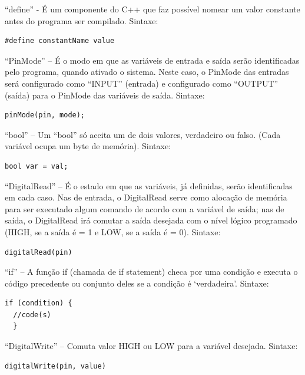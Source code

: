 \documentclass{article}
\begin{document}
``define'' - É um componente do C++ que faz possível nomear um valor constante antes do programa ser compilado. Sintaxe:
\begin{lstlisting}[style=Arduino]
#define constantName value
\end{lstlisting}

``PinMode'' – É o modo em que as variáveis de entrada e saída serão identificadas pelo programa, quando ativado o sistema. Neste caso, o PinMode das entradas será configurado como “INPUT” (entrada) e configurado como “OUTPUT” (saída) para o PinMode das variáveis de saída. Sintaxe:
\begin{lstlisting}[style=Arduino]
pinMode(pin, mode);
\end{lstlisting}

``bool'' – Um ``bool'' só aceita um de dois valores, verdadeiro ou falso. (Cada variável ocupa um byte de memória). Sintaxe:
\begin{lstlisting}[style=Arduino]
bool var = val;
\end{lstlisting}

``DigitalRead'' – É o estado em que as variáveis, já definidas, serão identificadas em cada caso. Nas de entrada, o DigitalRead serve como alocação de memória para ser executado algum comando de acordo com a variável de saída; nas de saída, o DigitalRead irá comutar a saída desejada com o nível lógico programado (HIGH, se a saída é = 1 e LOW, se a saída é = 0). Sintaxe:
\begin{lstlisting}[style=Arduino]
digitalRead(pin)
\end{lstlisting}

``if'' – A função if (chamada de if statement) checa por uma condição e executa o código precedente ou conjunto deles se a condição é ‘verdadeira’. Sintaxe:
\begin{lstlisting}[style=arduino]
if (condition) {
  //code(s)
  } 
\end{lstlisting}

``DigitalWrite'' – Comuta valor HIGH ou LOW para a variável desejada. Sintaxe:
\begin{lstlisting}[style=arduino]
digitalWrite(pin, value)
\end{lstlisting}
\end{document}
